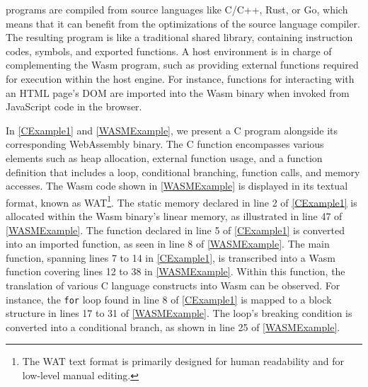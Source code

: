 

\Wasm programs are compiled from source languages like C/C++, Rust, or Go, which means that it can benefit from the optimizations of the source language compiler.
The resulting \wasm program is like a traditional shared library, containing instruction codes, symbols, and exported functions. 
A host environment is in charge of complementing the Wasm program, such as providing external functions required for execution within the host engine. 
For instance, functions for interacting with an HTML page's DOM are imported into the Wasm binary when invoked from JavaScript code in the browser. 


In \autoref{CExample1} and \autoref{WASMExample}, we present a C program alongside its corresponding WebAssembly binary. 
The C function encompasses various elements such as heap allocation, external function usage, and a function definition that includes a loop, conditional branching, function calls, and memory accesses.
The Wasm code shown in \autoref{WASMExample} is displayed in its textual format, known as WAT\footnote{The WAT text format is primarily designed for human readability and for low-level manual editing.}.
The static memory declared in line 2 of \autoref{CExample1} is allocated within the Wasm binary's linear memory, as illustrated in line 47 of \autoref{WASMExample}.
The function declared in line 5 of \autoref{CExample1} is converted into an imported function, as seen in line 8 of \autoref{WASMExample}.
The main function, spanning lines 7 to 14 in \autoref{CExample1}, is transcribed into a Wasm function covering lines 12 to 38 in \autoref{WASMExample}. Within this function, the translation of various C language constructs into Wasm can be observed.
For instance, the \texttt{for} loop found in line 8 of \autoref{CExample1} is mapped to a block structure in lines 17 to 31 of \autoref{WASMExample}. 
The loop's breaking condition is converted into a conditional branch, as shown in line 25 of \autoref{WASMExample}.


